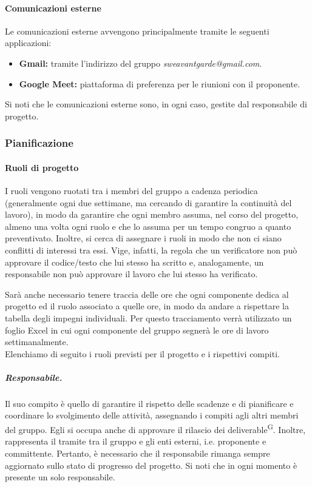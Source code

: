 \paragraph{Comunicazioni esterne}
Le comunicazioni esterne avvengono principalmente tramite le seguenti applicazioni:
\begin{itemize}
    \item \textbf{Gmail:} tramite l’indirizzo del gruppo \textit{sweavantgarde@gmail.com}.
    \item \textbf{Google Meet:} piattaforma di preferenza per le riunioni con il proponente.
\end{itemize}
Si noti che le comunicazioni esterne sono, in ogni caso, gestite dal responsabile di progetto. 

\subsubsection{Pianificazione}
\paragraph{Ruoli di progetto}\label{sec:processi_organizzativi:gestione_processi:pianificazione}
I ruoli vengono ruotati tra i membri del gruppo a cadenza periodica (generalmente ogni due settimane, ma cercando di garantire la continuità del lavoro), in modo da garantire che ogni membro assuma, nel corso del progetto, almeno una volta ogni ruolo e che lo assuma per un tempo congruo a quanto preventivato. 
Inoltre, si cerca di assegnare i ruoli in modo che non ci siano conflitti di interessi tra essi. Vige, infatti, la regola che un verificatore non può approvare il codice/testo che lui stesso ha scritto e, analogamente, un responsabile non può approvare il lavoro che lui stesso ha verificato. 

Sarà anche necessario tenere traccia delle ore che ogni componente dedica al progetto ed il ruolo associato a quelle ore, in modo da andare a rispettare la tabella degli impegni individuali. Per questo tracciamento verrà utilizzato un foglio Excel in cui ogni componente del gruppo segnerà le ore di lavoro settimanalmente.\\

\noindent Elenchiamo di seguito i ruoli previsti per il progetto e i rispettivi compiti.
\subparagraph{Responsabile.}
Il suo compito è quello di garantire il rispetto delle scadenze e di pianificare e coordinare lo svolgimento delle attività, assegnando i compiti agli altri membri del gruppo. Egli si occupa anche di approvare il rilascio dei deliverable\textsuperscript{G}.
Inoltre, rappresenta il tramite tra il gruppo e gli enti esterni, i.e. proponente e committente. Pertanto, è necessario che il responsabile rimanga sempre aggiornato sullo stato di progresso del progetto. Si noti che in ogni momento è presente un solo responsabile.

